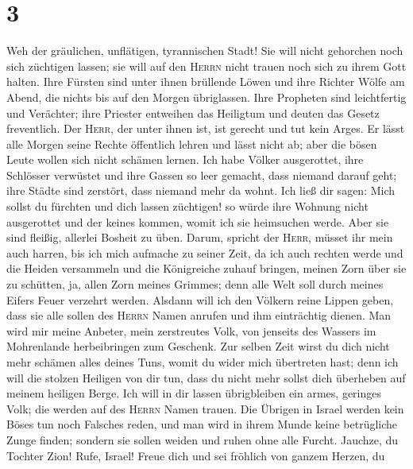 \hypertarget{section-2}{%
\section{3}\label{section-2}}

 Weh der gräulichen, unflätigen, tyrannischen Stadt!
 Sie will nicht gehorchen noch sich züchtigen lassen; sie
will auf den \textsc{Herrn} nicht trauen noch sich zu ihrem Gott halten.
 Ihre Fürsten sind unter ihnen brüllende Löwen und ihre
Richter Wölfe am Abend, die nichts bis auf den Morgen übriglassen.
 Ihre Propheten sind leichtfertig und Verächter; ihre
Priester entweihen das Heiligtum und deuten das Gesetz freventlich.
 Der \textsc{Herr}, der unter ihnen ist, ist gerecht und
tut kein Arges. Er lässt alle Morgen seine Rechte öffentlich lehren und
lässt nicht ab; aber die bösen Leute wollen sich nicht schämen lernen.
 Ich habe Völker ausgerottet, ihre Schlösser verwüstet und
ihre Gassen so leer gemacht, dass niemand darauf geht; ihre Städte sind
zerstört, dass niemand mehr da wohnt.  Ich ließ dir sagen:
Mich sollst du fürchten und dich lassen züchtigen! so würde ihre Wohnung
nicht ausgerottet und der keines kommen, womit ich sie heimsuchen werde.
Aber sie sind fleißig, allerlei Bosheit zu üben.  Darum,
spricht der \textsc{Herr}, müsset ihr mein auch harren, bis ich mich
aufmache zu seiner Zeit, da ich auch rechten werde und die Heiden
versammeln und die Königreiche zuhauf bringen, meinen Zorn über sie zu
schütten, ja, allen Zorn meines Grimmes; denn alle Welt soll durch
meines Eifers Feuer verzehrt werden.  Alsdann will ich den
Völkern reine Lippen geben, dass sie alle sollen des \textsc{Herrn}
Namen anrufen und ihm einträchtig dienen.  Man wird mir
meine Anbeter, mein zerstreutes Volk, von jenseits des Wassers im
Mohrenlande herbeibringen zum Geschenk.  Zur selben Zeit
wirst du dich nicht mehr schämen alles deines Tuns, womit du wider mich
übertreten hast; denn ich will die stolzen Heiligen von dir tun, dass du
nicht mehr sollst dich überheben auf meinem heiligen Berge.
 Ich will in dir lassen übrigbleiben ein armes, geringes
Volk; die werden auf des \textsc{Herrn} Namen trauen. 
Die Übrigen in Israel werden kein Böses tun noch Falsches reden, und man
wird in ihrem Munde keine betrügliche Zunge finden; sondern sie sollen
weiden und ruhen ohne alle Furcht.  Jauchze, du Tochter
Zion! Rufe, Israel! Freue dich und sei fröhlich von ganzem Herzen, du
